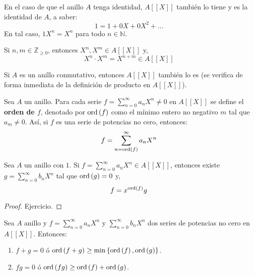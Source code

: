 \documentclass[12pt]{report}
\theoremstyle{largebreak}
\newcommand{\ord}[1]{\ensuremath{\textup{ord}\left(#1\right)}}
\begin{document}
    \begin{obs}
        En el caso de que el anillo $A$ tenga identidad, $A[[X]]$ también lo tiene y es la identidad de $A$, a saber:
        \begin{equation*}
            1=1+0X+0X^2+...
        \end{equation*}
        En tal caso, $1X^n=X^n$ para todo $n\in\mathbb{N}$.
    \end{obs}

    \begin{obs}
        Si $n,m\in\mathbb{Z}_{\geq0}$, entonces $X^n,X^m\in A[[X]]$ y,
        \begin{equation*}
            X^n\cdot X^m=X^{ n+m}\in A[[X]]
        \end{equation*}
    \end{obs}

    \begin{obs}
        Si $A$ es un anillo conmutativo, entonces $A[[X]]$ también lo es (se verifica de forma inmediata de la definición de producto en $A[[X]]$).
    \end{obs}

    \begin{mydef}
        Sea $A$ un anillo. Para cada serie $f=\sum_{ n=0}^\infty a_nX^n\neq0$ en $A[[X]]$ se define el \textbf{orden de $f$}, denotado por $\ord{f}$ como el mínimo entero no negativo $m$ tal que $a_{m}\neq0$. Así, si $f$ es una serie de potencias no cero, entonces:
        \begin{equation*}
            f=\sum_{ n=\ord{f}}^\infty a_nX^n
        \end{equation*}
    \end{mydef}

    \begin{excer}
        Sea $A$ un anillo con $1$. Si $f=\sum_{ n=0}^\infty a_nX^n\in A[[X]]$, entonces existe $g=\sum_{ n=0}^\infty b_nX^n$ tal que $\ord{g}=0$ y,
        \begin{equation*}
            f=x^{\ord{f}}g
        \end{equation*}
    \end{excer}

    \begin{proof}
        Ejercicio.
    \end{proof}

    \begin{propo}
        Sea $A$ anillo y $f=\sum_{ n=0}^\infty a_nX^n$ y $\sum_{ n=0}^\infty b_nX^n$ dos series de potencias no cero en $A[[X]]$. Entonces:
        \begin{enumerate}
            \item $f+g=0$ ó $\ord{f+g}\geq\min\left\{\ord{f},\ord{g}\right\}$.
            \item $fg=0$ ó $\ord{fg}\geq\ord{f}+\ord{g}$.
        \end{enumerate}
    \end{propo}
\end{document}

